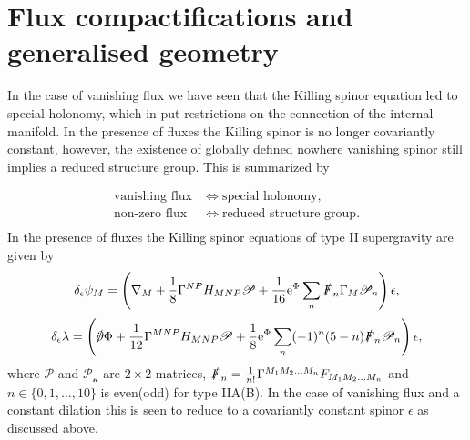\section{Flux compactifications and generalised geometry}
In the case of vanishing flux we have seen that the Killing spinor equation led to special holonomy, which in put restrictions on the connection of the internal manifold. In the presence of fluxes the Killing spinor is no longer covariantly constant, however, the existence of globally defined nowhere vanishing spinor still implies a reduced structure group. This is summarized by 

\begin{align*}
    \text{vanishing flux}&\Longleftrightarrow \text{special holonomy},\\
    \text{non-zero flux}&\Longleftrightarrow \text{reduced structure group}.\\
\end{align*}
In the presence of fluxes the Killing spinor equations of type II supergravity are given by \cite{Blumenhagen2013}
\begin{equation}
    \delta_\epsilon \psi_M = \left(\nabla_M+\frac{1}{8}\Gamma^{NP}H_{MNP}\mathscr{P}+\frac{1}{16}\mathrm{e}^\Phi\sum_{n}\slashed{F}_n\Gamma_M\mathscr{P}_n\right)\epsilon,
\end{equation}
\begin{equation}
    \delta_\epsilon \lambda = \left(\slashed{\pd}\Phi+\frac{1}{12}\Gamma^{MNP}H_{MNP}\mathscr{P}+\frac{1}{8}\ee^\Phi\sum_{n}(-1)^n(5-n)\slashed{F}_n\mathscr{P}_n\right)\epsilon,
\end{equation}
where $\mathscr{P}$ and $\mathscr{P_n}$ are $2\times 2$-matrices, $\slashed{F}_n=\frac{1}{n!}\Gamma^{M_1M_2\ldots M_n}F_{M_1M_2\ldots M_n}$ and $n\in\{0,1,\ldots,10\}$ is even(odd) for type IIA(B). In the case of vanishing flux and a constant dilation this is seen to reduce to a covariantly constant spinor $\epsilon$ as discussed above. 

